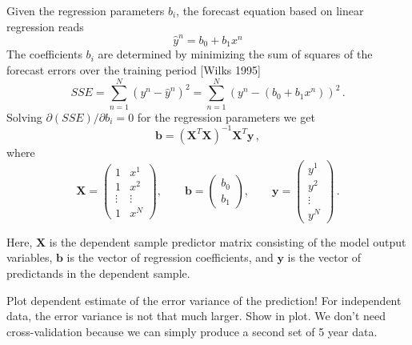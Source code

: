 \documentclass[10pt]{article}
\newcommand \be {\begin{equation}}
\newcommand \ee {\end{equation}}
\begin{document}
Given the regression parameters $b_i$, the forecast equation based on linear regression reads
\[ \hat{y}^n = b_0 + b_1 x^n  \]
The coefficients $b_i$ are determined by minimizing the sum of squares of the forecast errors over the training period [Wilks 1995]
\[ SSE = \sum_{n=1}^N (y^n - \hat{y}^n)^2 = \sum_{n=1}^N (y^n - (b_0 + b_1 x^n))^2  \,.\]  
Solving $\partial (SSE) / \partial b_i = 0$ for the regression parameters we get
\be\label{eq:regr} \mathbf{b} = (\mathbf{X}^T \mathbf{X})^{-1} \mathbf{X}^T \mathbf{y}\,,  \ee
where 
\[ \mathbf{X} = 
\begin{pmatrix} 
1 & x^1 \\
1 & x^2 \\
\vdots & \vdots \\
1 & x^N 
\end{pmatrix}, \qquad 
\mathbf{b} = \begin{pmatrix} b_0 \\ b_1 \end{pmatrix}, \qquad 
\mathbf{y} =  \begin{pmatrix} y^1 \\ y^2 \\ \vdots \\ y^N \end{pmatrix}\,.  \]

Here, $\mathbf{X}$ is the dependent sample predictor matrix consisting of the model output variables, $\mathbf{b}$ is the vector of regression coefficients, and $\mathbf{y}$ is the vector of predictands in the dependent sample.

Plot dependent estimate of the error variance of the prediction! For independent data, the error variance is not that much larger. Show in plot.  We don't need cross-validation because we can simply produce a second set of 5 year data.
\end{document}
